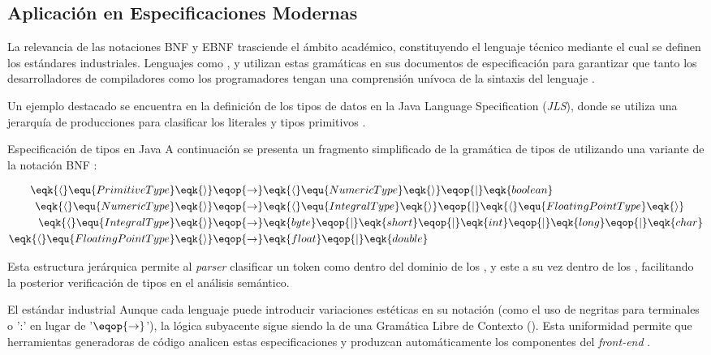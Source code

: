 \subsection{Aplicación en Especificaciones Modernas}
\label{subsec:3_3_4_especificaciones}

La relevancia de las notaciones BNF y EBNF trasciende el ámbito académico, constituyendo el lenguaje técnico mediante el cual se definen los estándares industriales. Lenguajes como ,  y  utilizan estas gramáticas en sus documentos de especificación para garantizar que tanto los desarrolladores de compiladores como los programadores tengan una comprensión unívoca de la sintaxis del lenguaje \cite{aho2006compilers}.

Un ejemplo destacado se encuentra en la definición de los tipos de datos en la Java Language Specification (\textit{JLS}), donde se utiliza una jerarquía de producciones para clasificar los literales y tipos primitivos \cite{aho2006compilers}.

\begin{ejemplo}{Especificación de tipos en Java}
A continuación se presenta un fragmento simplificado de la gramática de tipos de  utilizando una variante de la notación BNF \cite{aho2006compilers}:

\begin{align*}
\eqk{\langle} \equ{PrimitiveType} \eqk{\rangle} &\eqop{\rightarrow} \eqk{\langle} \equ{NumericType} \eqk{\rangle} \eqop{\mid} \eqk{boolean} \\
\eqk{\langle} \equ{NumericType} \eqk{\rangle} &\eqop{\rightarrow} \eqk{\langle} \equ{IntegralType} \eqk{\rangle} \eqop{\mid} \eqk{\langle} \equ{FloatingPointType} \eqk{\rangle} \\
\eqk{\langle} \equ{IntegralType} \eqk{\rangle} &\eqop{\rightarrow} \eqk{byte} \eqop{\mid} \eqk{short} \eqop{\mid} \eqk{int} \eqop{\mid} \eqk{long} \eqop{\mid} \eqk{char} \\
\eqk{\langle} \equ{FloatingPointType} \eqk{\rangle} &\eqop{\rightarrow} \eqk{float} \eqop{\mid} \eqk{double}
\end{align*}

Esta estructura jerárquica permite al \textit{parser} clasificar un token como  dentro del dominio de los , y este a su vez dentro de los , facilitando la posterior verificación de tipos en el análisis semántico.
\end{ejemplo}

\begin{observacion}{El estándar industrial}
Aunque cada lenguaje puede introducir variaciones estéticas en su notación (como el uso de negritas para terminales o ':' en lugar de '$\eqop{\rightarrow}$'), la lógica subyacente sigue siendo la de una Gramática Libre de Contexto (). Esta uniformidad permite que herramientas generadoras de código analicen estas especificaciones y produzcan automáticamente los componentes del \textit{front-end} \cite{aho2006compilers}.
\end{observacion}

